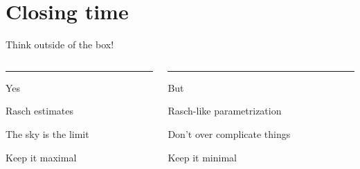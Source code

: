 \documentclass{beamer}
\begin{document}
\section{Closing time}
\begin{frame}
	
	\begin{center}
\Large
		Think outside of the box!
	\end{center}
\vspace{2mm}
\begin{columns}[T] %
	\begin{column}{.50\textwidth}
		\color{template}\rule{\linewidth}{4pt}
		\begin{center}
			\large{Yes}
		\end{center}
	\normalcolor
		Rasch estimates 
		
		\vspace{1.5mm}
		The sky is the limit
		
			\vspace{1.5mm}
		Keep it maximal
	\end{column}%
	\hfill%
	\begin{column}{.50\textwidth}
			\onslide<1->
		\color{but}\rule{\linewidth}{4pt}
		\begin{center}
			\large{But}
		\end{center}
	\normalcolor
		 Rasch-like parametrization
		 
		 	\vspace{1.5mm}
		 Don't over complicate things 
		 
		 	\vspace{1.5mm}
		 Keep it minimal
	\end{column}%
\end{columns}  

	
	\centering
            
\end{frame}
\end{document}
